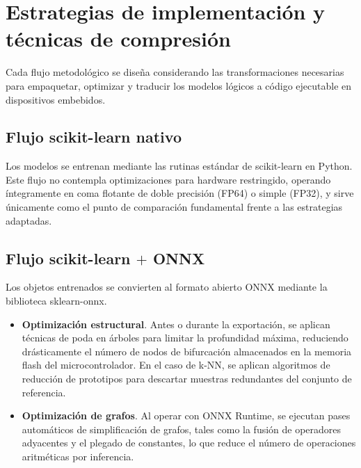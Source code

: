 \documentclass[a4paper,12pt,twoside,final]{book}
\begin{document}
\section{Estrategias de implementación y técnicas de compresión}
Cada flujo metodológico se diseña considerando las transformaciones necesarias para empaquetar, optimizar y traducir
los modelos lógicos a código ejecutable en dispositivos embebidos.

\subsection{Flujo scikit-learn nativo}
Los modelos se entrenan mediante las rutinas estándar de scikit-learn en Python. Este flujo no contempla
optimizaciones para hardware restringido, operando íntegramente en coma flotante de doble precisión (FP64) o simple
(FP32), y sirve únicamente como el punto de comparación fundamental frente a las estrategias adaptadas.

\subsection{Flujo scikit-learn $+$ ONNX}
Los objetos entrenados se convierten al formato abierto ONNX mediante la biblioteca sklearn-onnx.
\begin{itemize}
  \item \textbf{Optimización estructural}. Antes o durante la exportación, se aplican técnicas de poda en árboles para
  limitar la profundidad máxima, reduciendo drásticamente el número de nodos de bifurcación almacenados en la memoria
  flash del microcontrolador. En el caso de k-NN, se aplican algoritmos de reducción de prototipos para descartar
  muestras redundantes del conjunto de referencia.
  \item \textbf{Optimización de grafos}. Al operar con ONNX Runtime, se ejecutan pases automáticos de simplificación de
  grafos, tales como la fusión de operadores adyacentes y el plegado de constantes, lo que reduce el número de 
  operaciones aritméticas por inferencia.
\end{itemize}
\end{document}
